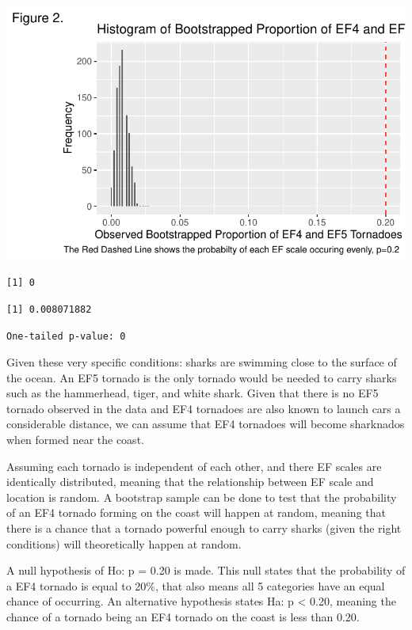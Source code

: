 \documentclass[
  letterpaper,
  DIV=11,
  numbers=noendperiod]{scrreprt}
\begin{document}
\includegraphics{draft-results2_files/figure-pdf/Bootstrap Sampling-1.pdf}

\begin{verbatim}
[1] 0
\end{verbatim}

\begin{verbatim}
[1] 0.008071882
\end{verbatim}

\begin{verbatim}
One-tailed p-value: 0 
\end{verbatim}

Given these very specific conditions: sharks are swimming close to the
surface of the ocean. An EF5 tornado is the only tornado would be needed
to carry sharks such as the hammerhead, tiger, and white shark. Given
that there is no EF5 tornado observed in the data and EF4 tornadoes are
also known to launch cars a considerable distance, we can assume that
EF4 tornadoes will become sharknados when formed near the coast.

Assuming each tornado is independent of each other, and there EF scales
are identically distributed, meaning that the relationship between EF
scale and location is random. A bootstrap sample can be done to test
that the probability of an EF4 tornado forming on the coast will happen
at random, meaning that there is a chance that a tornado powerful enough
to carry sharks (given the right conditions) will theoretically happen
at random.

A null hypothesis of Ho: p = 0.20 is made. This null states that the
probability of a EF4 tornado is equal to 20\%, that also means all 5
categories have an equal chance of occurring. An alternative hypothesis
states Ha: p \textless{} 0.20, meaning the chance of a tornado being an
EF4 tornado on the coast is less than 0.20.
\end{document}
